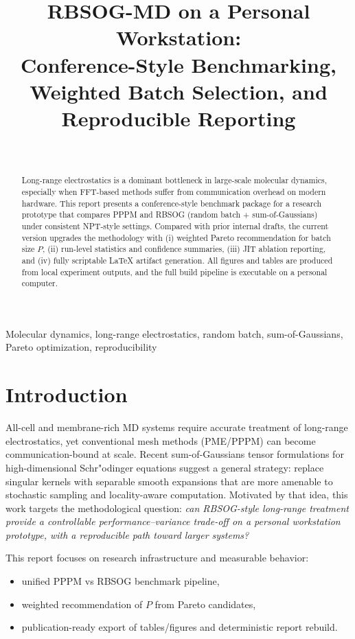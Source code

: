 \documentclass[conference]{IEEEtran}
\title{RBSOG-MD on a Personal Workstation:\\
Conference-Style Benchmarking, Weighted Batch Selection, and Reproducible Reporting}
\author{\IEEEauthorblockN{RBSOG-MD Prototype Study}\\
\IEEEauthorblockA{Single-Workstation Reproducibility Track}}
\begin{document}
\maketitle



\begin{abstract}
Long-range electrostatics is a dominant bottleneck in large-scale molecular dynamics,
especially when FFT-based methods suffer from communication overhead on modern hardware.
This report presents a conference-style benchmark package for a research prototype that compares
PPPM and RBSOG (random batch + sum-of-Gaussians) under consistent NPT-style settings.
Compared with prior internal drafts, the current version upgrades the methodology with
(i) weighted Pareto recommendation for batch size $P$,
(ii) run-level statistics and confidence summaries,
(iii) JIT ablation reporting,
and (iv) fully scriptable LaTeX artifact generation.
All figures and tables are produced from local experiment outputs, and the full build pipeline
is executable on a personal computer.
\end{abstract}

\begin{IEEEkeywords}
Molecular dynamics, long-range electrostatics, random batch, sum-of-Gaussians, Pareto optimization, reproducibility
\end{IEEEkeywords}

\section{Introduction}
All-cell and membrane-rich MD systems require accurate treatment of long-range electrostatics,
yet conventional mesh methods (PME/PPPM) can become communication-bound at scale.
Recent sum-of-Gaussians tensor formulations for high-dimensional Schr"odinger equations suggest a
general strategy: replace singular kernels with separable smooth expansions that are more amenable
to stochastic sampling and locality-aware computation.
Motivated by that idea, this work targets the methodological question:
\textit{can RBSOG-style long-range treatment provide a controllable performance--variance trade-off
on a personal workstation prototype, with a reproducible path toward larger systems?}

This report focuses on research infrastructure and measurable behavior:
\begin{itemize}
\item unified PPPM vs RBSOG benchmark pipeline,
\item weighted recommendation of $P$ from Pareto candidates,
\item publication-ready export of tables/figures and deterministic report rebuild.
\end{itemize}
\end{document}

